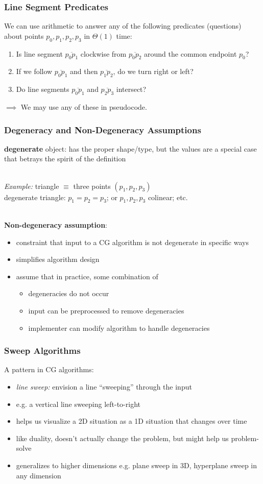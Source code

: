 \documentclass{beamer}
\newcommand{\stanza}{ \\~\ }
\begin{document}
\begin{frame} \frametitle{Line Segment Predicates}
We can use arithmetic to answer any of the following predicates (questions)
about points $p_0, p_1, p_2, p_3$ in $\Theta(1)$ time:
\begin{enumerate}
  \item Is line segment $\overline{p_0 p_1}$ clockwise from $\overline{p_0 p_2}$
    around the common endpoint $p_0$?
  \item If we follow $\overline{p_0 p_1}$ and then $\overline{p_1 p_2}$, do we
    turn right or left?
  \item Do line segments $\overline{p_0 p_1}$ and $\overline{p_2 p_3}$
    intersect?
\end{enumerate}

$\implies$ We may use any of these in pseudocode.
\end{frame}

\begin{frame} \frametitle{Degeneracy and Non-Degeneracy Assumptions}
\textbf{degenerate} object: has the proper shape/type, but the values are a
  special case that betrays the spirit of the definition \stanza

\emph{Example:} triangle $\equiv$ three points $(p_1, p_2, p_3)$ \\
degenerate triangle: $p_1=p_2=p_3$; or $p_1, p_2, p_3$ colinear; etc. \stanza

\textbf{Non-degeneracy assumption}:
\begin{itemize}
  \item constraint that input to a CG algorithm is not degenerate in specific ways
  \item simplifies algorithm design
  \item assume that in practice, some combination of
  \begin{itemize}
    \item degeneracies do not occur
    \item input can be preprocessed to remove degeneracies
    \item implementer can modify algorithm to handle degeneracies
  \end{itemize}
\end{itemize}
\end{frame}

\begin{frame} \frametitle{Sweep Algorithms}
A pattern in CG algorithms:
\begin{itemize}
  \item \emph{line sweep:} envision a line ``sweeping'' through the input
  \item e.g. a vertical line sweeping left-to-right
  \item helps us visualize a 2D situation as a 1D situation that changes over
    time
  \item like duality, doesn't actually change the problem, but might help us
    problem-solve
  \item generalizes to higher dimensions e.g. plane sweep in 3D, hyperplane sweep
    in any dimension
\end{itemize}
\end{frame}
\end{document}

